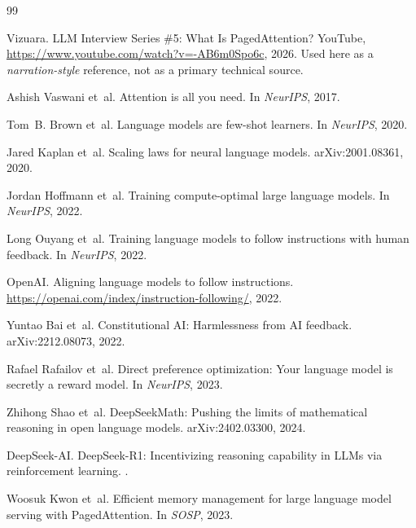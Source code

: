 \documentclass[11pt,a4paper]{article}
\begin{document}
\begin{thebibliography}{99}

Vizuara.
\newblock LLM Interview Series \#5: What Is PagedAttention?
\newblock YouTube, \url{https://www.youtube.com/watch?v=-AB6m0Spo6c}, 2026.
\newblock Used here as a \emph{narration-style} reference, not as a primary technical source.

Ashish Vaswani et~al.
\newblock Attention is all you need.
\newblock In \emph{NeurIPS}, 2017.

Tom~B. Brown et~al.
\newblock Language models are few-shot learners.
\newblock In \emph{NeurIPS}, 2020.

Jared Kaplan et~al.
\newblock Scaling laws for neural language models.
\newblock arXiv:2001.08361, 2020.

Jordan Hoffmann et~al.
\newblock Training compute-optimal large language models.
\newblock In \emph{NeurIPS}, 2022.

Long Ouyang et~al.
\newblock Training language models to follow instructions with human feedback.
\newblock In \emph{NeurIPS}, 2022.

OpenAI.
\newblock Aligning language models to follow instructions.
\newblock \url{https://openai.com/index/instruction-following/}, 2022.

Yuntao Bai et~al.
\newblock Constitutional AI: Harmlessness from AI feedback.
\newblock arXiv:2212.08073, 2022.

Rafael Rafailov et~al.
\newblock Direct preference optimization: Your language model is secretly a reward model.
\newblock In \emph{NeurIPS}, 2023.

Zhihong Shao et~al.
\newblock DeepSeekMath: Pushing the limits of mathematical reasoning in open language models.
\newblock arXiv:2402.03300, 2024.

DeepSeek-AI.
\newblock DeepSeek-R1: Incentivizing reasoning capability in LLMs via reinforcement learning.
.

Woosuk Kwon et~al.
\newblock Efficient memory management for large language model serving with PagedAttention.
\newblock In \emph{SOSP}, 2023.


\end{thebibliography}
\end{document}
